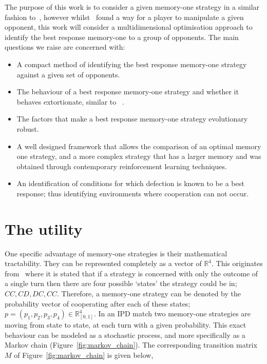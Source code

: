 \documentclass[10pt]{article}
\newcommand{\R}{\mathbb{R}}
\begin{document}
The purpose of this work is to consider a given memory-one strategy in a similar
fashion to~\cite{Press2012}, however whilst~\cite{Press2012} found a way for a
player to manipulate a given opponent, this work will consider a
multidimensional optimisation approach to identify the best response memory-one
to a group of opponents. The main questions we raise are concerned with:

\begin{itemize}
    \item A compact method of identifying the best response memory-one strategy
    against a given set of opponents.
    \item The behaviour of a best response memory-one strategy and whether it
    behaves extortionate, similar to ~\cite{Press2012}.
    \item The factors that make a best response memory-one strategy evolutionary
    robust.
    \item A well designed framework that allows the comparison of an optimal memory
          one strategy, and a more complex strategy that has a larger memory and
          was obtained through contemporary reinforcement learning techniques.
    \item An identification of conditions for which defection is known to be
    a best response; thus identifying environments where cooperation can
    not occur.
\end{itemize}

\section{The utility}\label{section:utility}

One specific advantage of memory-one strategies is their mathematical
tractability. They can be represented completely as a vector of \(\R^{4}\). This
originates from~\cite{Nowak1989} where it is stated that if a strategy is
concerned with only the outcome of a single turn then there are four possible
`states' the strategy could be in; \(CC, CD, DC,CC\). Therefore, a memory-one
strategy can be denoted by the probability vector of cooperating after each of
these states; \(p=(p_1, p_2, p_3, p_4) \in \R_{[0,1]} ^ 4\). In an IPD match two
memory-one strategies are moving from state to state, at each turn with a given
probability. This exact behaviour can be modeled as a stochastic process, and
more specifically as a Markov chain (Figure~\ref{fig:markov_chain}). The
corresponding transition matrix \(M\) of Figure~\ref{fig:markov_chain} is given
below,
\end{document}
